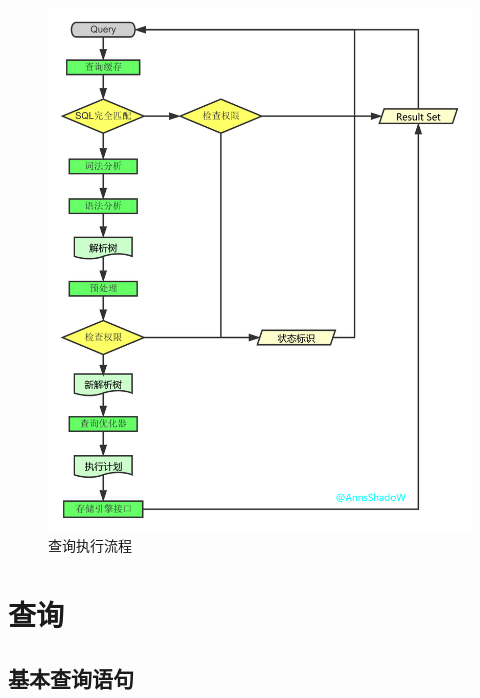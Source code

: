 \documentclass[UTF8,a4paper,12pt]{ctexbook}
\begin{document}
				\begin{figure}[H]
					\centering
					\includegraphics[scale=.26]{mysqlProcess}
					\caption{查询执行流程}
				\end{figure}
\chapter{查询}
	\section{基本查询语句}
\end{document}
